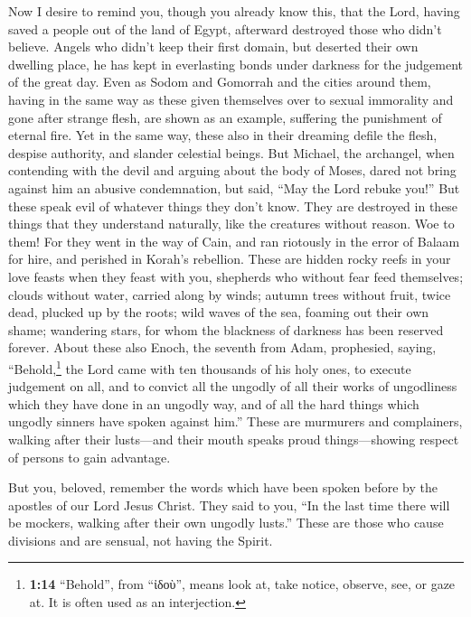  Now I desire to remind you, though you already know this,
that the Lord, having saved a people out of the land of Egypt, afterward
destroyed those who didn't believe.  Angels who didn't
keep their first domain, but deserted their own dwelling place, he has
kept in everlasting bonds under darkness for the judgement of the great
day.  Even as Sodom and Gomorrah and the cities around
them, having in the same way as these given themselves over to sexual
immorality and gone after strange flesh, are shown as an example,
suffering the punishment of eternal fire.  Yet in the same
way, these also in their dreaming defile the flesh, despise authority,
and slander celestial beings.  But Michael, the archangel,
when contending with the devil and arguing about the body of Moses,
dared not bring against him an abusive condemnation, but said, ``May the
Lord rebuke you!''  But these speak evil of whatever
things they don't know. They are destroyed in these things that they
understand naturally, like the creatures without reason. 
Woe to them! For they went in the way of Cain, and ran riotously in the
error of Balaam for hire, and perished in Korah's rebellion.
 These are hidden rocky reefs in your love feasts when
they feast with you, shepherds who without fear feed themselves; clouds
without water, carried along by winds; autumn trees without fruit, twice
dead, plucked up by the roots;  wild waves of the sea,
foaming out their own shame; wandering stars, for whom the blackness of
darkness has been reserved forever.  About these also
Enoch, the seventh from Adam, prophesied, saying, ``Behold,\footnote{\textbf{1:14}
  ``Behold'', from ``ἰδοὺ'', means look at, take notice, observe, see,
  or gaze at. It is often used as an interjection.} the Lord came with
ten thousands of his holy ones,  to execute judgement on
all, and to convict all the ungodly of all their works of ungodliness
which they have done in an ungodly way, and of all the hard things which
ungodly sinners have spoken against him.''  These are
murmurers and complainers, walking after their lusts---and their mouth
speaks proud things---showing respect of persons to gain advantage.

 But you, beloved, remember the words which have been
spoken before by the apostles of our Lord Jesus Christ. 
They said to you, ``In the last time there will be mockers, walking
after their own ungodly lusts.''  These are those who
cause divisions and are sensual, not having the Spirit.

